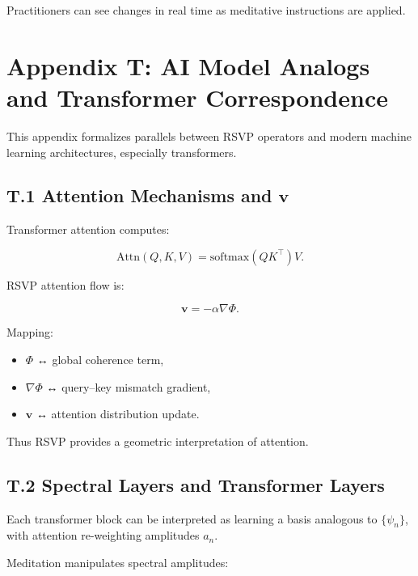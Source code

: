 \documentclass[12pt]{article}
\begin{document}
Practitioners can see changes in real time as meditative instructions are applied.



\section*{Appendix T: AI Model Analogs and Transformer Correspondence}

This appendix formalizes parallels between RSVP operators and modern machine
learning architectures, especially transformers.

\subsection*{T.1 Attention Mechanisms and $\mathbf{v}$}

Transformer attention computes:

\[
\mathrm{Attn}(Q,K,V) = \mathrm{softmax}(QK^\top)V.
\]

RSVP attention flow is:

\[
\mathbf{v} = -\alpha \nabla \Phi.
\]

Mapping:

\begin{itemize}
    \item $\Phi$ ↔ global coherence term,
    \item $\nabla\Phi$ ↔ query–key mismatch gradient,
    \item $\mathbf{v}$ ↔ attention distribution update.
\end{itemize}

Thus RSVP provides a geometric interpretation of attention.

\subsection*{T.2 Spectral Layers and Transformer Layers}

Each transformer block can be interpreted as learning a basis analogous to
$\{\psi_n\}$, with attention re-weighting amplitudes $a_n$.

Meditation manipulates spectral amplitudes:
\end{document}
